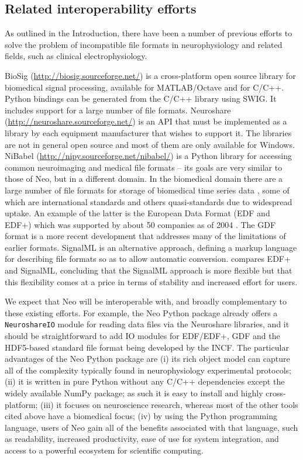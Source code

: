 \documentclass{frontiers}
\begin{document}
\subsection{Related interoperability efforts}

As outlined in the Introduction, there have been a number of previous efforts to solve the problem of incompatible file formats in neurophysiology and related fields, such as clinical electrophysiology.

BioSig (\url{http://biosig.sourceforge.net/}) is a cross-platform open source library for biomedical signal processing, available for MATLAB/Octave and for C/C++. 
Python bindings can be generated from the C/C++ library using SWIG. 
It includes support for a large number of file formats. 
Neuroshare (\url{http://neuroshare.sourceforge.net/}) is an API that must be implemented as a library by each equipment manufacturer that wishes to support it. 
The libraries are not in general open source and most of them are only available for Windows. 
NiBabel (\url{http://nipy.sourceforge.net/nibabel/}) is a Python library for accessing common neuroimaging and medical file formats -- its goals are very similar to those of Neo, but in a different domain. 
In the biomedical domain there are a large number of file formats for storage of biomedical time series data 
\citep[ECG, EEG, etc.; reviewed in][]{Schloegl2010}, some of which are international standards and others quasi-standards due to widespread uptake. An example of the latter is the European Data Format (EDF and EDF+) which was supported by about 50 companies as of 2004 \citep{Kemp2004}. The GDF format \citep{Schloegl2006} is a more recent development that addresses many of the limitations of earlier formats.
SignalML \citep{Durka2004} is an alternative approach, defining a markup language for describing file formats so as to allow automatic conversion.
\citet{Kemp2004} compares EDF+ and SignalML, concluding that the SignalML approach is more flexible but that this flexibility comes at a price in terms of stability and increased effort for users.

We expect that Neo will be interoperable with, and broadly complementary to these existing efforts. 
For example, the Neo Python package already offers a \lstinline`NeuroshareIO` module for reading data files via the Neuroshare libraries, and it should be straightforward to add IO modules for EDF/EDF+, GDF and the HDF5-based standard file format being developed by the INCF.
The particular advantages of the Neo Python package are 
(i) its rich object model can capture all of the complexity typically found in neurophysiology experimental protocols; 
(ii) it is written in pure Python without any C/C++ dependencies except the widely available NumPy package; as such it is easy to install and highly cross-platform; 
(iii) it focuses on neuroscience research, whereas most of the other tools cited above have a biomedical focus; 
(iv) by using the Python programming language, users of Neo gain all of the benefits associated with that language, such as readability, increased productivity, ease of use for system integration, and access to a powerful ecosystem for scientific computing.
\end{document}
